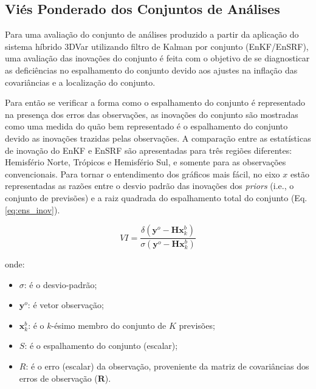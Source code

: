 \subsection{Viés Ponderado dos Conjuntos de Análises}
\label{sec:inov_conj_anl}

Para uma avaliação do conjunto de análises produzido a partir da aplicação do sistema híbrido 3DVar utilizando filtro de Kalman por conjunto (EnKF/EnSRF), uma avaliação das inovações do conjunto é feita com o objetivo de se diagnosticar as deficiências no espalhamento do conjunto devido aos ajustes na inflação das covariâncias e a localização do conjunto.

Para então se verificar a forma como o espalhamento do conjunto é representado na presença dos erros das observações, as inovações do conjunto são mostradas como uma medida do quão bem representado é o espalhamento do conjunto devido as inovações trazidas pelas observações. A comparação entre as estatísticas de inovação do EnKF e EnSRF são apresentadas para três regiões diferentes: Hemisfério Norte, Trópicos e Hemisfério Sul, e somente para as observações convencionais. Para tornar o entendimento dos gráficos mais fácil, no eixo $x$ estão representadas as razões entre o desvio padrão das inovações dos \textit{priors} (i.e., o conjunto de previsões) e a raiz quadrada do espalhamento total do conjunto (Eq. \ref{eq:ens_inov}).


\begin{equation}
  \label{eq:ens_inov}
  VI = \frac{\delta{(\mathbf{y}^{o}-\mathbf{H}\mathbf{x}^{b}_{k})}}{\sigma{(\mathbf{y}^{o}-\mathbf{H}\mathbf{x}^{b}_{k})}}
\end{equation}

onde:

\begin{itemize}
    \item $\sigma$: é o desvio-padrão;
    \item $\mathbf{y}^{o}$: é vetor observação;
    \item $\mathbf{x}^{b}_{k}$: é o $k$-ésimo membro do conjunto de $K$ previsões;
    \item $S$: é o espalhamento do conjunto (escalar);
    \item $R$: é o erro (escalar) da observação, proveniente da matriz de covariâncias dos erros de observação ($\mathbf{R}$).
\end{itemize}

